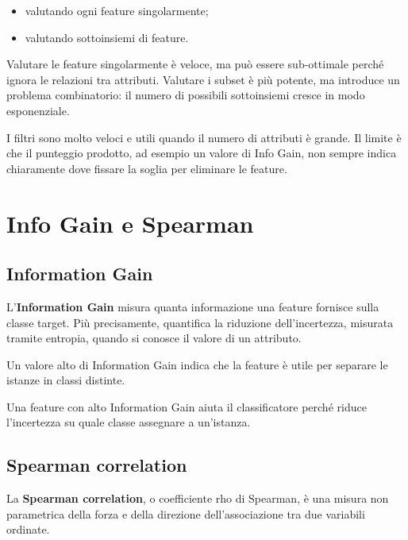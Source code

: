 \begin{itemize}
    \item valutando ogni feature singolarmente;
    \item valutando sottoinsiemi di feature.
\end{itemize}

Valutare le feature singolarmente è veloce, ma può essere sub-ottimale perché ignora le relazioni tra attributi. Valutare i subset è più potente, ma introduce un problema combinatorio: il numero di possibili sottoinsiemi cresce in modo esponenziale.

\begin{notaprof}
I filtri sono molto veloci e utili quando il numero di attributi è grande. Il limite è che il punteggio prodotto, ad esempio un valore di Info Gain, non sempre indica chiaramente dove fissare la soglia per eliminare le feature.
\end{notaprof}

\section{Info Gain e Spearman}

\subsection{Information Gain}

L'\textbf{Information Gain} misura quanta informazione una feature fornisce sulla classe target. Più precisamente, quantifica la riduzione dell'incertezza, misurata tramite entropia, quando si conosce il valore di un attributo.

Un valore alto di Information Gain indica che la feature è utile per separare le istanze in classi distinte.

\begin{notaprof}
Una feature con alto Information Gain aiuta il classificatore perché riduce l'incertezza su quale classe assegnare a un'istanza.
\end{notaprof}

\subsection{Spearman correlation}

La \textbf{Spearman correlation}, o coefficiente rho di Spearman, è una misura non parametrica della forza e della direzione dell'associazione tra due variabili ordinate.

